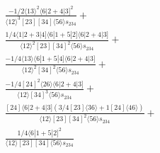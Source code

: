 \documentclass[varwidth, border=5pt]{standalone}
\begin{document}
\begin{my}
$\begin{gathered}
\scriptscriptstyle\frac{-1/2⟨13⟩^2⟨6|2+4|3]^2}{⟨12⟩^3[23][34]⟨56⟩s_{234}}+\\
\scriptscriptstyle\frac{1/4⟨1|2+3|4]⟨6|1+5|2]⟨6|2+4|3]}{⟨12⟩^2[23][34]^2⟨56⟩s_{234}}+\\
\scriptscriptstyle\frac{-1/4⟨13⟩⟨6|1+5|4]⟨6|2+4|3]}{⟨12⟩^2[34]^2⟨56⟩s_{234}}+\\
\scriptscriptstyle\frac{-1/4[24]^2⟨26⟩⟨6|2+4|3]}{⟨12⟩[34]^3⟨56⟩s_{234}}+\\
\scriptscriptstyle\frac{[24]⟨6|2+4|3](3/4[23]⟨36⟩+1[24]⟨46⟩)}{⟨12⟩[23][34]^2⟨56⟩s_{234}}+\\
\scriptscriptstyle\frac{1/4⟨6|1+5|2]^2}{⟨12⟩[23][34]⟨56⟩s_{234}}\phantom{+}
\end{gathered}$
\end{my}
\end{document}
